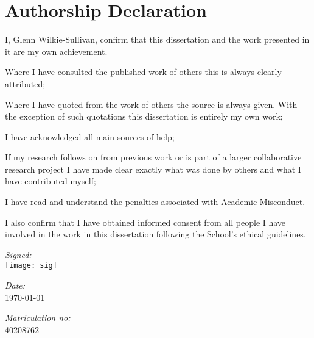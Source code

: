 
\section*{Authorship Declaration}
\vspace{0.5cm}
\begin{flushleft}
I, Glenn Wilkie-Sullivan, confirm that this dissertation and the work presented in it are my own achievement.\newline

Where I have consulted the published work of others this is always clearly attributed;\newline

Where I have quoted from the work of others the source is always given. With the exception of such quotations this dissertation is entirely my own work;\newline

I have acknowledged all main sources of help; \newline

If my research follows on from previous work or is part of a larger collaborative research project I have made clear exactly what was done by others and what I have contributed myself;\newline

I have read and understand the penalties associated with Academic Misconduct.\newline

I also confirm that I have obtained informed consent from all people I have involved in the work in this dissertation following the School's ethical guidelines.\newline
\end{flushleft}

\begin{flushleft} \large
\emph{Signed:} \\
\texttt{[image: sig]}
\end{flushleft}

\vspace{.5cm}

\begin{flushleft} \large
\emph{Date:} \\
\today
\end{flushleft}

\vspace{.5cm}

\begin{flushleft} \large
\emph{Matriculation no: }  \\ 40208762
\end{flushleft}